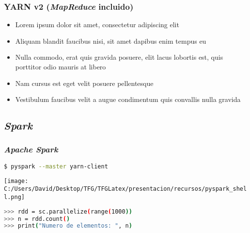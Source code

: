 \documentclass{beamer}
\begin{document}
\begin{frame}
\frametitle{YARN v2 (\textit{MapReduce} incluido)}
\begin{itemize}
\item Lorem ipsum dolor sit amet, consectetur adipiscing elit
\item Aliquam blandit faucibus nisi, sit amet dapibus enim tempus eu
\item Nulla commodo, erat quis gravida posuere, elit lacus lobortis est, quis porttitor odio mauris at libero
\item Nam cursus est eget velit posuere pellentesque
\item Vestibulum faucibus velit a augue condimentum quis convallis nulla gravida
\end{itemize}
\end{frame}


\begin{frame} %

\end{frame}

\subsection{\textit{Spark}}

\begin{frame}[fragile]
\frametitle{\textit{Apache Spark}}

\begin{lstlisting}[language=bash, numbers=none, frame=single]
$ pyspark --master yarn-client
\end{lstlisting}

\texttt{[image: C:/Users/David/Desktop/TFG/TFGLatex/presentacion/recursos/pyspark\_shell.png]}

\begin{lstlisting}[language=bash, numbers=none, frame=single, showstringspaces=false]
>>> rdd = sc.parallelize(range(1000))
>>> n = rdd.count()
>>> print("Numero de elementos: ", n)
\end{lstlisting}

\end{frame}

\end{document}
